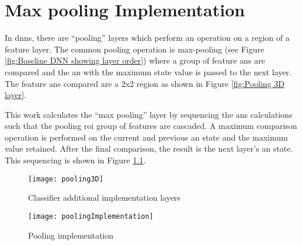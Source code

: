 

\chapter{Max pooling Implementation}
\label{sec:Appendix-B}
\label{sec:Max pooling}

In \acp{dnn}, there are ``pooling''\cite{stanford_pooling} layers which perform an operation on a region of a feature layer. 
The common pooling operation is max-pooling (see Figure \ref{fig:Baseline DNN showing layer order}) where a group of feature \acp{an} are compared and the \ac{an} with the maximum state value is passed to the next layer.
The feature \acp{an} compared are a 2x2 region as shown in Figure \ref{fig:Pooling 3D layer}.

This work calculates the ``max pooling'' layer by sequencing the \acp{an} calculations such that the pooling \ac{roi} group of features are cascaded.
A maximum comparison operation is performed on the current and previous \ac{an} state and the maximum value retained. After the final comparison, the result is the next layer's \ac{an} state.
This sequencing is shown in Figure \ref{fig:Pooling implementation}.

\begin{figure}[h]
  \centering
  \captionsetup{justification=centering}
  \captionsetup{width=0.9\textwidth}
  \begin{minipage}{1\textwidth}
    \centering
    \centerline{
    \mbox{\texttt{[image: pooling3D]}}
    }
    \caption{Classifier additional implementation layers}
    \label{fig:Pooling 3D layer}
  \end{minipage}

  \bigskip
  \vspace{0.5cm}
  \begin{minipage}{1\textwidth}
    \centering
    \centerline{
    \mbox{\texttt{[image: poolingImplementation]}}
    }
    \caption{Pooling implementation}
    \label{fig:Pooling implementation}
  \end{minipage}
\end{figure}


